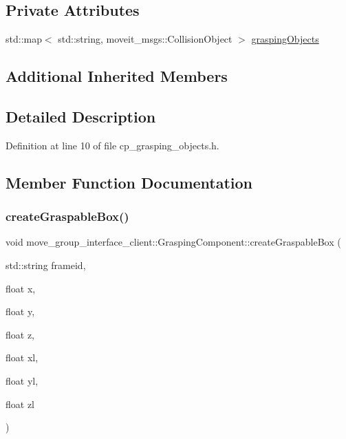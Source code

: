 \subsection*{Private Attributes}
\begin{DoxyCompactItemize}
\item 
std\+::map$<$ std\+::string, moveit\+\_\+msgs\+::\+Collision\+Object $>$ \hyperlink{classmove__group__interface__client_1_1GraspingComponent_aeed40e6ade0536714390acd6a8a2a366}{grasping\+Objects}
\end{DoxyCompactItemize}
\subsection*{Additional Inherited Members}


\subsection{Detailed Description}


Definition at line 10 of file cp\+\_\+grasping\+\_\+objects.\+h.



\subsection{Member Function Documentation}
\mbox{\label{classmove__group__interface__client_1_1GraspingComponent_aee05ddd624cf0d5ff773e7517999d31f}} 
\subsubsection{\texorpdfstring{create\+Graspable\+Box()}{createGraspableBox()}}
{\footnotesize\ttfamily void move\+\_\+group\+\_\+interface\+\_\+client\+::\+Grasping\+Component\+::create\+Graspable\+Box (\begin{DoxyParamCaption}\item[{std\+::string}]{frameid,  }\item[{float}]{x,  }\item[{float}]{y,  }\item[{float}]{z,  }\item[{float}]{xl,  }\item[{float}]{yl,  }\item[{float}]{zl }\end{DoxyParamCaption})}



